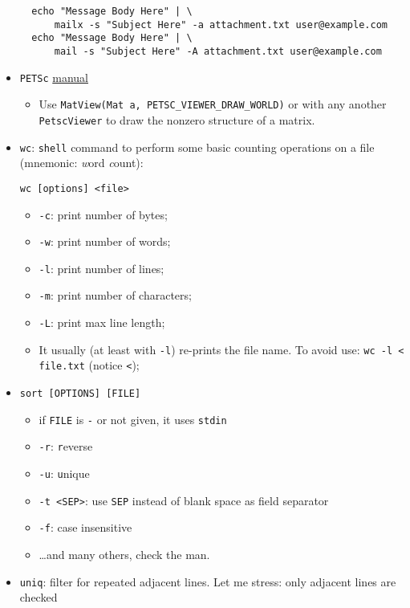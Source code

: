 \documentclass[a4paper,12pt,%
              final%
              ]{article}
\begin{document}
\begin{itemize}
\begin{verbatim}
  echo "Message Body Here" | \
      mailx -s "Subject Here" -a attachment.txt user@example.com
  echo "Message Body Here" | \
      mail -s "Subject Here" -A attachment.txt user@example.com
\end{verbatim}
  \item \texttt{PETSc} \href{https://www.mcs.anl.gov/petsc/petsc-current/docs/manual.pdf}{manual}
    \begin{itemize}
      \item Use \verb|MatView(Mat a, PETSC_VIEWER_DRAW_WORLD)| or with any another \texttt{PetscViewer} to draw the nonzero structure of a matrix.
    \end{itemize}
  \item \texttt{wc}: \texttt{shell} command to perform some basic counting operations on a file (mnemonic: \emph{w}ord \emph{c}ount):
\begin{verbatim}
wc [options] <file>
\end{verbatim}
    \begin{itemize}
      \item \verb|-c|: print number of bytes;
      \item \verb|-w|: print number of words;
      \item \verb|-l|: print number of lines;
      \item \verb|-m|: print number of characters;
      \item \verb|-L|: print max line length;
      \item It usually (at least with \verb|-l|) re-prints the file name. To avoid use: \verb|wc -l < file.txt| (notice \verb|<|);
    \end{itemize}
  \item \texttt{sort [OPTIONS] [FILE]}
    \begin{itemize}
      \item if \texttt{FILE} is \texttt{-} or not given, it uses \texttt{stdin}
      \item \verb|-r|: \texttt{r}everse
      \item \verb|-u|: \texttt{u}nique
      \item \verb|-t <SEP>|: use \texttt{SEP} instead of blank space as field separator
      \item \verb|-f|: case insensitive
      \item \ldots and many others, check the man.
    \end{itemize}
  \item \texttt{uniq}: filter for repeated adjacent lines. Let me stress: only adjacent lines are checked

\end{itemize}
\end{document}
